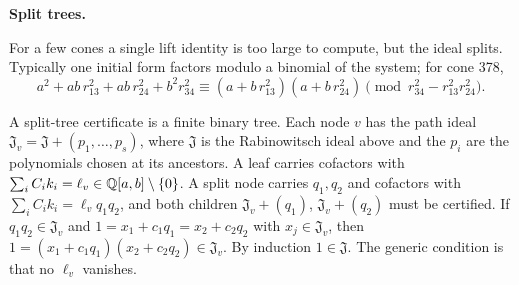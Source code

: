 \documentclass[11pt]{amsart}
\newcommand{\topic}[1]{\par\addvspace{1.4ex}\noindent\textbf{#1}\par\nobreak\smallskip\noindent}
\theoremstyle{definition}\newtheorem{definition}[theorem]{Definition}\theoremstyle{remark}\newtheorem{remark}[theorem]{Remark}
\begin{document}
\begin{samepage}
\topic{Split trees.} For a few cones a single lift identity is too large to compute, but the ideal splits. Typically one initial form factors modulo a binomial of the system; for cone 378,
\[
 a^2+ab\,r_{13}^2+ab\,r_{24}^2+b^2r_{34}^2
 \equiv(a+b\,r_{13}^2)(a+b\,r_{24}^2)
 \pmod{r_{34}^2-r_{13}^2r_{24}^2}.
\]
\end{samepage}
A split-tree certificate is a finite binary tree. Each node $v$ has the path ideal $\mathfrak J_v=\mathfrak J+(p_1,\dots,p_s)$, where $\mathfrak J$ is the Rabinowitsch ideal above and the $p_i$ are the polynomials chosen at its ancestors. A leaf carries cofactors with $\sum_iC_ik_i=\ell_v\in\mathbb{Q}[a,b]\setminus\{0\}$. A split node carries $q_1,q_2$ and cofactors with $\sum_iC_ik_i=\ell_vq_1q_2$, and both children $\mathfrak J_v+(q_1)$, $\mathfrak J_v+(q_2)$ must be certified. If $q_1q_2\in\mathfrak J_v$ and $1=x_1+c_1q_1=x_2+c_2q_2$ with $x_j\in\mathfrak J_v$, then $1=(x_1+c_1q_1)(x_2+c_2q_2)\in\mathfrak J_v$. By induction $1\in\mathfrak J$. The generic condition is that no $\ell_v$ vanishes.
\end{document}

